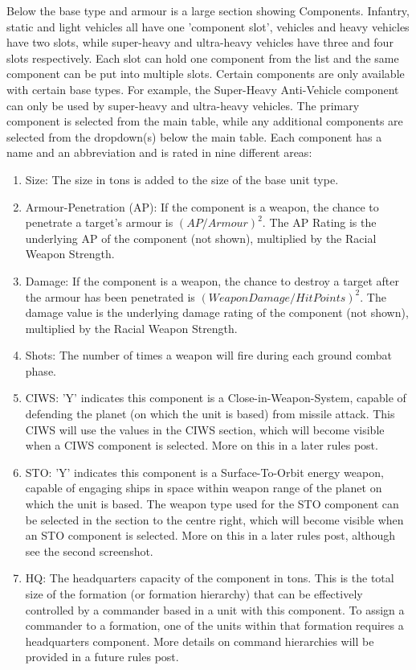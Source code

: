 \documentclass[../Aurora C# unofficial manual.tex]{subfiles}
\begin{document}
	Below the base type and armour is a large section showing Components. Infantry, static and light vehicles all have one 'component slot', vehicles and heavy vehicles have two slots, while super-heavy and ultra-heavy vehicles have three and four slots respectively. Each slot can hold one component from the list and the same component can be put into multiple slots. Certain components are only available with certain base types. For example, the Super-Heavy Anti-Vehicle component can only be used by super-heavy and ultra-heavy vehicles. The primary component is selected from the main table, while any additional components are selected from the dropdown(s) below the main table. Each component has a name and an abbreviation and is rated in nine different areas:
	\begin{enumerate}
		\item Size: The size in tons is added to the size of the base unit type.
		\item Armour-Penetration (AP): If the component is a weapon, the chance to penetrate a target's armour is \( (AP / Armour)^{2} \). The AP Rating is the underlying AP of the component (not shown), multiplied by the Racial Weapon Strength.
		\item Damage:  If the component is a weapon, the chance to destroy a target after the armour has been penetrated is \( (Weapon Damage / Hit Points)^{2} \). The damage value is the underlying damage rating of the component (not shown), multiplied by the Racial Weapon Strength.
		\item Shots: The number of times a weapon will fire during each ground combat phase.
		\item CIWS: 'Y' indicates this component is a Close-in-Weapon-System, capable of defending the planet (on which the unit is based) from missile attack. This CIWS will use the values in the CIWS section, which will become visible when a CIWS component is selected. More on this in a later rules post.
		\item STO: 'Y' indicates this component is a Surface-To-Orbit energy weapon, capable of engaging ships in space within weapon range of the planet on which the unit is based. The weapon type used for the STO component can be selected in the section to the centre right, which will become visible when an STO component is selected. More on this in a later rules post, although see the second screenshot.
		\item HQ: The headquarters capacity of the component in tons. This is the total size of the formation (or formation hierarchy) that can be effectively controlled by a commander based in a unit with this component. To assign a commander to a formation, one of the units within that formation requires a headquarters component. More details on command hierarchies will be provided in a future rules post.

\end{enumerate}
\end{document}
